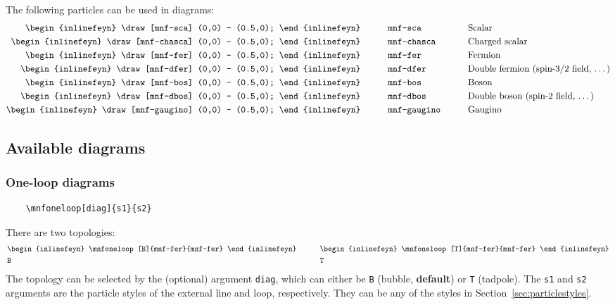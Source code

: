 \documentclass[11pt,a4paper]{article}
\newcommand{\testprop}[1]{%
    \begin{inlinefeyn}
        \draw[#1] (0,0) -- (0.5,0);
    \end{inlinefeyn}
}
\begin{document}
The following particles can be used in diagrams:
\begin{alignat}{3}
    \testprop{mnf-sca}\qquad     && &\texttt{mnf-sca}\qquad     && \text{Scalar}\nonumber                                   \\
    \testprop{mnf-chasca}\qquad  && &\texttt{mnf-chasca}\qquad  && \text{Charged scalar}\nonumber                           \\
    \testprop{mnf-fer}\qquad     && &\texttt{mnf-fer}\qquad     && \text{Fermion}\nonumber                                  \\
    \testprop{mnf-dfer}\qquad    && &\texttt{mnf-dfer}\qquad    && \text{Double fermion (spin-$3/2$ field, \dots)}\nonumber \\
    \testprop{mnf-bos}\qquad     && &\texttt{mnf-bos}\qquad     && \text{Boson}\nonumber                                    \\
    \testprop{mnf-dbos}\qquad    && &\texttt{mnf-dbos}\qquad    && \text{Double boson (spin-$2$ field, \dots)}\nonumber     \\
    \testprop{mnf-gaugino}\qquad && &\texttt{mnf-gaugino}\qquad && \text{Gaugino}
\end{alignat}

\subsection{Available diagrams}
\label{sec:diagrams}

\subsubsection{One-loop diagrams}

\begin{verbatim}
    \mnfoneloop[diag]{s1}{s2}
\end{verbatim}
There are two topologies:
\begin{alignat}{2}
    &\begin{inlinefeyn}
        \mnfoneloop[B]{mnf-fer}{mnf-fer}
    \end{inlinefeyn}\qquad
    &&
    \begin{inlinefeyn}
        \mnfoneloop[T]{mnf-fer}{mnf-fer}
    \end{inlinefeyn}\nonumber \\
    &\texttt{B}\qquad && \texttt{T}
\end{alignat}
The topology can be selected by the (optional) argument \texttt{diag}, which can either be \texttt{B} (bubble, \textbf{default}) or \texttt{T} (tadpole).
The \texttt{s1} and \texttt{s2} arguments are the particle styles of the external line and loop, respectively.
They can be any of the styles in Section~\ref{sec:particlestyles}.
\end{document}
